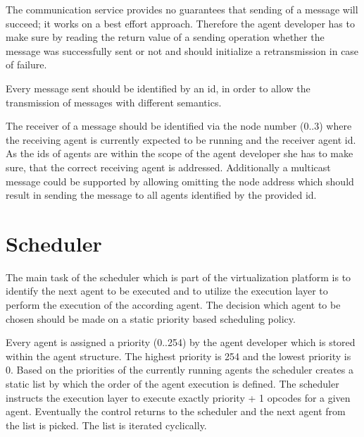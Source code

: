 \documentclass{scrreprt}
\begin{document}
\noindent
The communication service provides no guarantees that sending of a message will succeed; it works on a best effort 
approach. Therefore the agent developer has to make sure by reading the return value of a sending operation whether 
the message was successfully sent or not and should initialize a retransmission in case of failure. 


\noindent
Every message sent should be identified by an id, in order to allow the transmission of messages with different semantics.

\noindent
The receiver of a message should be identified via the node number (0..3) where the receiving agent is currently expected
to be running and the receiver agent id. As the ids of agents are within the scope of the agent developer she has to make 
sure, that the correct receiving agent is addressed. Additionally a multicast message could be supported by allowing omitting 
the node address which should result in sending the message to all agents identified by the provided id. 

\section{Scheduler}
The main task of the scheduler which is part of the virtualization platform is to identify the next agent to be executed 
and to utilize the execution layer to perform the execution of the according agent. The decision which agent to be chosen 
should be made on a static priority based scheduling policy.


\noindent
Every agent is assigned a priority (0..254) by the agent developer which is stored within the agent structure. 
The highest priority is 254 and the lowest priority is 0. Based on the priorities of the currently running agents 
the scheduler creates a static list by which the order of the agent execution is defined. The scheduler instructs 
the execution layer to execute exactly priority + 1 opcodes for a given agent. Eventually the control returns to 
the scheduler and the next agent from the list is picked. The list is iterated cyclically.
\end{document}
